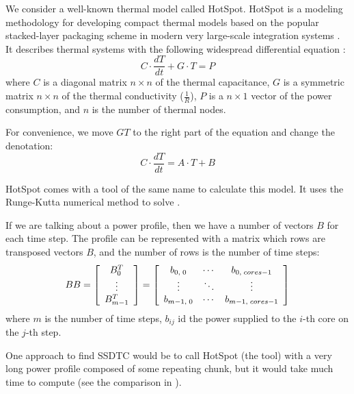 We consider a well-known thermal model called HotSpot. HotSpot is a modeling methodology for developing compact thermal models based on the popular stacked-layer packaging scheme in modern very large-scale integration systems \cite{huang2006}. It describes thermal systems with the following widespread differential equation \cite{rao2008}:
\[
  C \cdot \frac{dT}{dt} + G \cdot T = P
\]
where $C$ is a diagonal matrix $n \times n$ of the thermal capacitance, $G$ is a symmetric matrix $n \times n$ of the thermal conductivity ($\frac{1}{R}$), $P$ is a $n \times 1$ vector of the power consumption, and $n$ is the number of thermal nodes.

For convenience, we move $GT$ to the right part of the equation and change the denotation:
\begin{equation} \label{eq:initial}
  C \cdot \frac{dT}{dt} = A \cdot T + B
\end{equation}

HotSpot comes with a tool of the same name to calculate this model. It uses the Runge-Kutta numerical method to solve .

If we are talking about a power profile, then we have a number of vectors $B$ for each time step. The profile can be represented with a matrix which rows are transposed vectors $B$, and the number of rows is the number of time steps:
\[
  BB =
    \left[
      \begin{array}{c}
        B_0^T \\
        \vdots \\
        B_{m-1}^T
      \end{array}
    \right] =
    \left[
      \begin{array}{ccc}
        b_{0,\;0} & \cdots & b_{0,\;cores-1} \\
        \vdots & \ddots & \vdots \\
        b_{m-1,\;0} & \cdots & b_{m-1,\;cores-1}
      \end{array}
    \right]
\]
where $m$ is the number of time steps, $b_{ij}$ id the power supplied to the $i$-th core on the $j$-th step.

One approach to find SSDTC would be to call HotSpot (the tool) with a very long power profile composed of some repeating chunk, but it would take much time to compute (see the comparison in ).
